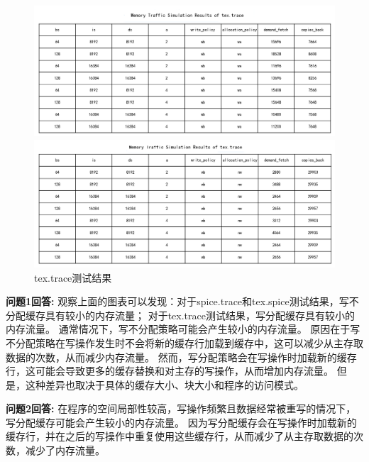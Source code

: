 \documentclass[12pt,hyperref,a4paper,UTF8]{ctexart}
\begin{document}
\begin{figure}[H]
    \centering
    \begin{minipage}[b]{0.45\textwidth}
        \centering
        \includegraphics[width=\textwidth]{./figures/fig/image43.png}
    \end{minipage}
    \hfill
    \begin{minipage}[b]{0.45\textwidth}
        \centering
        \includegraphics[width=\textwidth]{./figures/fig/image44.png}
    \end{minipage}
    \caption{tex.trace测试结果}
\end{figure}

\textbf{问题1回答:}
观察上面的图表可以发现：对于spice.trace和tex.spice测试结果，写不分配缓存具有较小的内存流量；
对于tex.trace测试结果，写分配缓存具有较小的内存流量。
通常情况下，写不分配策略可能会产生较小的内存流量。
原因在于写不分配策略在写操作发生时不会将新的缓存行加载到缓存中，这可以减少从主存取数据的次数，从而减少内存流量。
然而，写分配策略会在写操作时加载新的缓存行，这可能会导致更多的缓存替换和对主存的写操作，从而增加内存流量。
但是，这种差异也取决于具体的缓存大小、块大小和程序的访问模式。

\textbf{问题2回答:}
在程序的空间局部性较高，写操作频繁且数据经常被重写的情况下，写分配缓存可能会产生较小的内存流量。
因为写分配缓存会在写操作时加载新的缓存行，并在之后的写操作中重复使用这些缓存行，从而减少了从主存取数据的次数，减少了内存流量。
\end{document}
